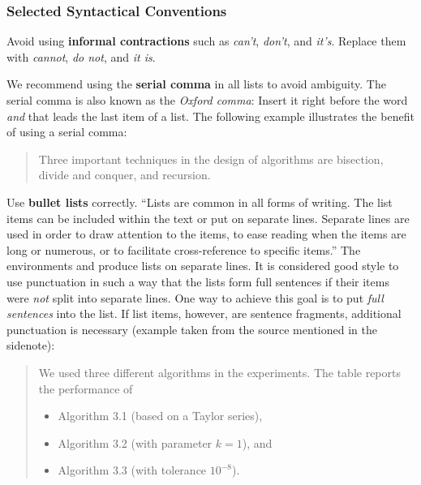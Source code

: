 \subsubsection{Selected Syntactical Conventions}

Avoid using \textbf{informal contractions} such as \emph{can't}, \emph{don't}, and \emph{it's}. Replace them with \emph{cannot}, \emph{do not}, and \emph{it is}.

We recommend using the \textbf{serial comma} in all lists to avoid ambiguity. The serial comma is also known as the \emph{Oxford comma}: Insert  it right before the word \emph{and} that leads the last item of a list. The following example%
illustrates the benefit of using a serial comma:
\begin{quote}
  Three important techniques in the design of algorithms are bisection, divide and conquer, and recursion.
\end{quote}

Use \textbf{bullet lists} correctly. ``Lists are common in all forms of writing. The list items can be included within the text or put on separate lines. Separate lines are used in order to draw attention to the items, to ease reading when the items are long or numerous, or to facilitate cross-reference to specific items.'' The environments  and  produce lists on separate lines. It is considered good style to use punctuation in such a way that the lists form full sentences if their items were \emph{not} split into separate lines. One way to achieve this goal is to put \emph{full sentences} into the list. If list items, however, are sentence fragments, additional punctuation is necessary (example taken from the source mentioned in the sidenote):

\begin{quote}
  We used three different algorithms in the experiments. The table reports the performance of
\begin{itemize}
\item Algorithm 3.1 (based on a Taylor series),
\item Algorithm 3.2 (with parameter \(k = 1\)), and
\item Algorithm 3.3 (with tolerance \(10^{-8}\)).
\end{itemize}
\end{quote}

